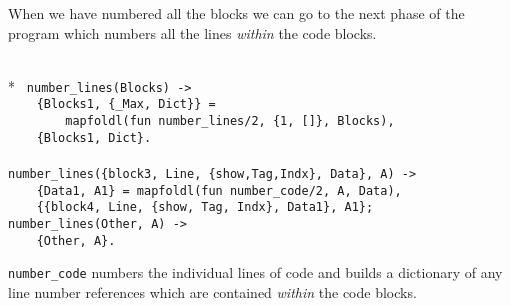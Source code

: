     When we have numbered all the blocks we can go to the next phase
of the program which numbers all the lines {\sl within\/} the code
blocks.

\begin{flushleft}
\label{analysis_3_6}
\\*
\tt
\noindent{}%
\verb&number_lines(Blocks) ->&\\
\noindent{}%
\verb&    {Blocks1, {_Max, Dict}} = &\\
\noindent{}%
\verb&        mapfoldl(fun number_lines/2, {1, []}, Blocks),&\\
\noindent{}%
\verb&    {Blocks1, Dict}.&\\
\noindent{}%
\verb&&\\
\noindent{}%
\verb&number_lines({block3, Line, {show,Tag,Indx}, Data}, A) ->&\\
\noindent{}%
\verb&    {Data1, A1} = mapfoldl(fun number_code/2, A, Data),&\\
\noindent{}%
\verb&    {{block4, Line, {show, Tag, Indx}, Data1}, A1};&\\
\noindent{}%
\verb&number_lines(Other, A) ->&\\
\noindent{}%
\verb&    {Other, A}.&\\
\end{flushleft}

\verb+number_code+ numbers the individual lines of code and builds a
dictionary of any line number references which are contained 
{\sl within\/} the code blocks.

